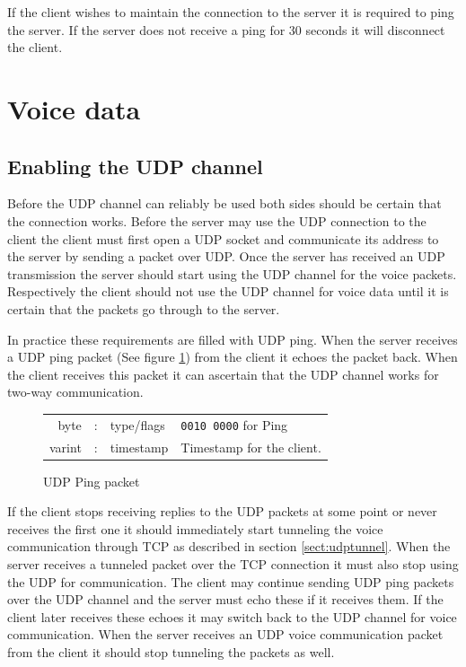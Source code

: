 \documentclass[11pt]{article} %
\begin{document}
If the client wishes to maintain the connection to the server it is required to ping the server. If the server does not receive a ping for 30 seconds it will disconnect the client.

\section {Voice data}

\subsection{Enabling the UDP channel}
\label{sect:udpping}

Before the UDP channel can reliably be used both sides should be certain that the connection works. Before the server may use the UDP connection to the client the client must first open a UDP socket and communicate its address to the server by sending a packet over UDP. Once the server has received an UDP transmission the server should start using the UDP channel for the voice packets. Respectively the client should not use the UDP channel for voice data until it is certain that the packets go through to the server.

In practice these requirements are filled with UDP ping. When the server receives a UDP ping packet (See figure \ref{fig:udpping}) from the client it echoes the packet back. When the client receives this packet it can ascertain that the UDP channel works for two-way communication.

\begin{figure}[H]\begin{center}\begin{tabular}{|rcl|p{}}

\cline{1-3}
byte &:& type/flags & \texttt{0010 0000} for Ping \\
\cline{1-3}
varint &:& timestamp & Timestamp for the client. \\
\cline{1-3}

\end{tabular}
\caption{UDP Ping packet}\label{fig:udpping}
\end{center}\end{figure}

If the client stops receiving replies to the UDP packets at some point or never receives the first one it should immediately start tunneling the voice communication through TCP as described in section \ref{sect:udptunnel}. When the server receives a tunneled packet over the TCP connection it must also stop using the UDP for communication. The client may continue sending UDP ping packets over the UDP channel and the server must echo these if it receives them. If the client later receives these echoes it may switch back to the UDP channel for voice communication. When the server receives an UDP voice communication packet from the client it should stop tunneling the packets as well.
\end{document}
